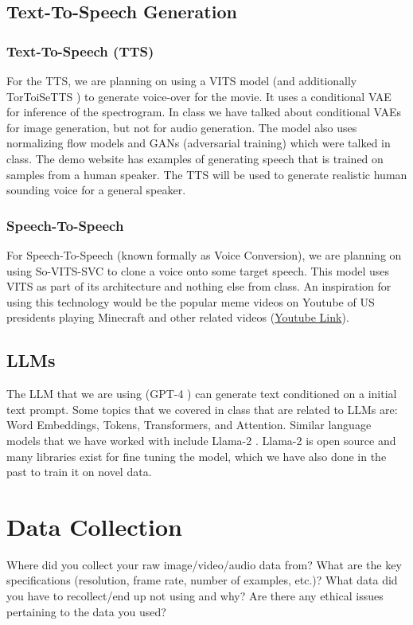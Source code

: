 \documentclass[conference]{IEEEtran}
\begin{document}
\subsection{Text-To-Speech Generation}
\subsubsection{Text-To-Speech (TTS)}
For the TTS, we are planning on using a VITS \cite{vits} model (and additionally TorToiSeTTS \cite{ttts}) to generate voice-over for the movie.
It uses a conditional VAE for inference of the spectrogram. In class we have talked about
conditional VAEs for image generation, but not for audio generation. The model
also uses normalizing flow models and GANs (adversarial training) which were talked
in class.
The demo website \cite{vits-demo} has examples of generating speech that is trained
on samples from a human speaker. The TTS will be used to generate realistic
human sounding voice for a general speaker.
\subsubsection{Speech-To-Speech}
For Speech-To-Speech (known formally as Voice Conversion), we are planning on using
So-VITS-SVC to clone a voice onto some target speech. This model uses VITS as part of its
architecture and nothing else from class.
An inspiration for using this technology would be the popular meme videos on Youtube of
US presidents playing Minecraft and other related videos \cite{minecraft} (\href{https://www.youtube.com/watch?v=qYF0jhwrzxA}{Youtube Link}).

\subsection{LLMs}
The LLM that we are using (GPT-4 \cite{gpt4}) can generate text conditioned
on a initial text prompt. Some topics that we covered in class that are related
to LLMs are: Word Embeddings, Tokens, Transformers, and Attention. Similar language models that we have worked with include Llama-2 \cite{llama}. Llama-2 is open source and many libraries exist for fine tuning the model, which we have also done in the past to train it on novel data.

\section{Data Collection}

\begin{tcolorbox}
Where did you collect your raw image/video/audio data from? What are the key specifications (resolution, frame rate, number of examples, etc.)? What data did you have to recollect/end up not using and why? Are there any ethical issues pertaining to the data you used?
\end{tcolorbox}
\end{document}
